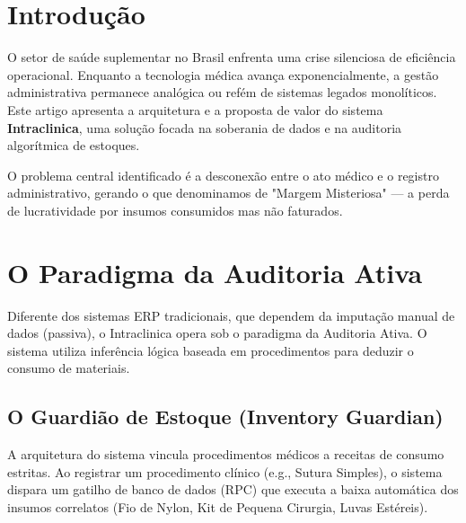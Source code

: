 \documentclass[12pt, openright, twoside, a4paper, english, french, spanish]{abntex2}
\begin{document}

\frenchspacing 

\textual

\section*{Introdução}

O setor de saúde suplementar no Brasil enfrenta uma crise silenciosa de eficiência operacional. Enquanto a tecnologia médica avança exponencialmente, a gestão administrativa permanece analógica ou refém de sistemas legados monolíticos. Este artigo apresenta a arquitetura e a proposta de valor do sistema \textbf{Intraclinica}, uma solução focada na soberania de dados e na auditoria algorítmica de estoques.

O problema central identificado é a desconexão entre o ato médico e o registro administrativo, gerando o que denominamos de "Margem Misteriosa" --- a perda de lucratividade por insumos consumidos mas não faturados.

\section{O Paradigma da Auditoria Ativa}

Diferente dos sistemas ERP tradicionais, que dependem da imputação manual de dados (passiva), o Intraclinica opera sob o paradigma da Auditoria Ativa. O sistema utiliza inferência lógica baseada em procedimentos para deduzir o consumo de materiais.

\subsection{O Guardião de Estoque (Inventory Guardian)}

A arquitetura do sistema vincula procedimentos médicos a receitas de consumo estritas. Ao registrar um procedimento clínico (e.g., Sutura Simples), o sistema dispara um gatilho de banco de dados (RPC) que executa a baixa automática dos insumos correlatos (Fio de Nylon, Kit de Pequena Cirurgia, Luvas Estéreis).
\end{document}
